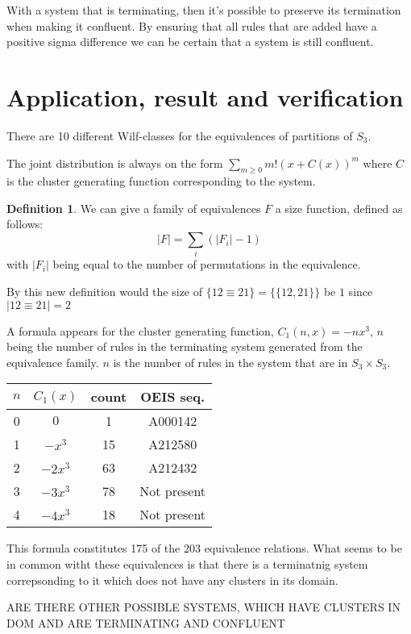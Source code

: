 \documentclass[a4paper, 11pt]{article}
\theoremstyle{definition}
\newtheorem{definition}[theorem]{Definition}
\newcommand{\Sym}{S}
\begin{document}
With a system that is terminating, then it's possible to preserve its
termination when making it confluent.
By ensuring that all rules that are added have a positive sigma difference
we can be certain that a system is still confluent. 


\section{Application, result and verification}
There are 10 different Wilf-classes for the equivalences of partitions of $S_3$.

The joint distribution is always on the form $\sum_{m \geq 0}m!(x+C(x))^m$ where $C$
is the cluster generating function corresponding to the system.

\begin{definition}
    We can give a family of equivalences $F$ a size function, defined as follows:
    \[
        |F| = \sum_i (|F_i|-1)
    \]
    with $|F_i|$ being equal to the number of permutations in the equivalence.
\end{definition}

By this new definition would the size of $\{12 \equiv 21\}=\{\{12,21\}\}$ be $1$ since $|12 \equiv
21| = 2$

A formula appears for the cluster generating function, $C_1(n,x) = -nx^3$, $n$ being the number of rules
in the terminating system generated from the equivalence family. $n$ is the
number of rules in the system that are in $\Sym_3 \times \Sym_3$.
\begin{center}
\begin{tabular}{c|c|c|c}
    $n$ & $C_1(x)$ & count & OEIS seq. \\
    \hline
    0 & $0$ & 1 & A000142 \\
    1 & $-x^3$ & 15 & A212580 \\
    2 & $-2x^3$ & 63 & A212432 \\
    3 & $-3x^3$ & 78 & Not present \\
    4 & $-4x^3$ & 18 & Not present \\
\end{tabular}
\end{center}
This formula constitutes 175 of the 203 equivalence relations.
What seems to be in common witht these equivalences is that there is a
terminatnig system correpsonding to it which does not have any clusters in its
domain. 

ARE THERE OTHER POSSIBLE SYSTEMS, WHICH HAVE CLUSTERS IN DOM AND ARE TERMINATING AND
CONFLUENT 
\end{document}
